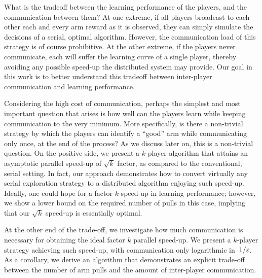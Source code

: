 \documentclass{article} %
\begin{document}
What is the tradeoff between the learning performance of the players, and the communication between them?
At one extreme, if all players broadcast to each other each and every arm reward as it is observed, they can simply simulate the decisions of a serial, optimal algorithm. 
However, the communication load of this strategy is of course prohibitive. 
At the other extreme, if the players never communicate, each will suffer the learning curve of a single player, thereby avoiding any possible speed-up the distributed system may provide.
Our goal in this work is to better understand this tradeoff between inter-player communication and learning performance.

Considering the high cost of communication, perhaps the simplest and most important question that arises is how well can the players learn while keeping communication to the very minimum.
More specifically, is there a non-trivial strategy by which the players can identify a ``good'' arm while communicating only once, at the end of the process?
As we discuss later on, this is a non-trivial question.
On the positive side, we present a $k$-player algorithm that attains an asymptotic parallel speed-up of $\sqrt{k}$ factor, as compared to the conventional, serial setting.
In fact, our approach demonstrates how to convert virtually any serial exploration strategy to a distributed algorithm enjoying such speed-up.
Ideally, one could hope for a factor $k$ speed-up in learning performance; however, we show a lower bound on the required number of pulls in this case, implying that our $\sqrt{k}$ speed-up is essentially optimal.

At the other end of the trade-off, we investigate how much communication is necessary for obtaining the ideal factor $k$ parallel speed-up. 
We present a $k$-player strategy achieving such speed-up, with communication only logarithmic in~$1/\varepsilon$.
As a corollary, we derive an algorithm that demonstrates an explicit trade-off between the number of arm pulls and the amount of inter-player communication.
\end{document}
